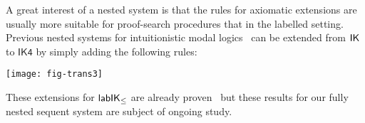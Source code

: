 \documentclass[twoside]{aiml20}
\begin{document}
A great interest of a nested system is that the rules for axiomatic extensions are usually more suitable for proof-search procedures that in the labelled setting.
%
Previous nested systems for intuitionistic modal logics~\cite{strassburger2013,kuznets:strassburger:maehara} can be extended from $\mathsf{IK}$ to $\mathsf{IK4}$ by simply adding the following rules:%

\begin{center}
	\texttt{[image: fig-trans3]}
\end{center}

%
These extensions for $\mathsf{lab}\mathsf{IK}_{\le}$ are already proven~\cite{marin:morales:strassburger:hal} but these results for our fully nested sequent system are subject of ongoing study. 




%
%
\end{document}
